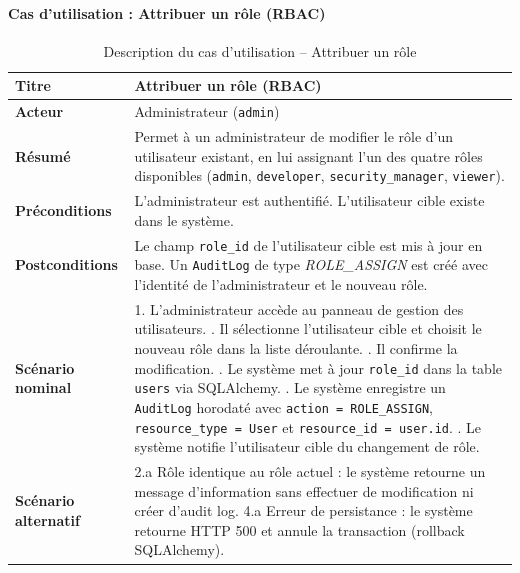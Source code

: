 \paragraph{Cas d'utilisation : Attribuer un rôle (RBAC)}
\begin{table}[H]
\centering
\caption{Description du cas d'utilisation -- Attribuer un rôle}
\label{tab:uc-rbac}
\small
\renewcommand{\arraystretch}{1.3}
\begin{tabularx}{\textwidth}{>{\bfseries}p{3.5cm} X}
\hline
Titre & Attribuer un rôle (RBAC) \\
\hline
Acteur & Administrateur (\texttt{admin}) \\
\hline
Résumé & Permet à un administrateur de modifier le rôle d'un utilisateur existant, en lui assignant l'un des quatre rôles disponibles (\texttt{admin}, \texttt{developer}, \texttt{security\_manager}, \texttt{viewer}). \\
\hline
Préconditions & L'administrateur est authentifié. L'utilisateur cible existe dans le système. \\
\hline
Postconditions & Le champ \texttt{role\_id} de l'utilisateur cible est mis à jour en base. Un \texttt{AuditLog} de type \textit{ROLE\_ASSIGN} est créé avec l'identité de l'administrateur et le nouveau rôle. \\
\hline
Scénario nominal &
1. L'administrateur accède au panneau de gestion des utilisateurs. \newline
2. Il sélectionne l'utilisateur cible et choisit le nouveau rôle dans la liste déroulante. \newline
3. Il confirme la modification. \newline
4. Le système met à jour \texttt{role\_id} dans la table \texttt{users} via SQLAlchemy. \newline
5. Le système enregistre un \texttt{AuditLog} horodaté avec \texttt{action = ROLE\_ASSIGN}, \texttt{resource\_type = User} et \texttt{resource\_id = user.id}. \newline
6. Le système notifie l'utilisateur cible du changement de rôle. \\
\hline
Scénario alternatif &
2.a Rôle identique au rôle actuel : le système retourne un message d'information sans effectuer de modification ni créer d'audit log. \newline
4.a Erreur de persistance : le système retourne HTTP 500 et annule la transaction (rollback SQLAlchemy). \\
\hline
\end{tabularx}
\end{table}

